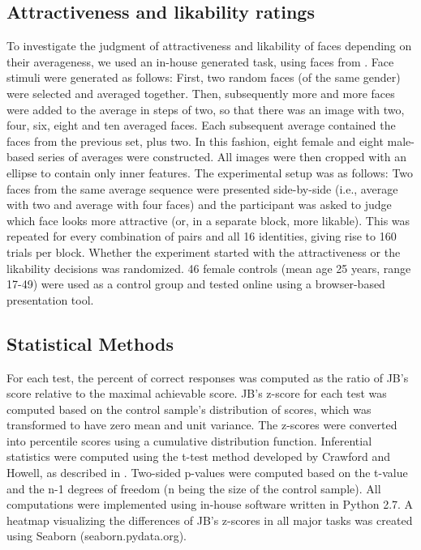 \documentclass[fleqn,10pt]{SelfArx} %
\begin{document}
\subsection*{Attractiveness and likability ratings}
To investigate the judgment of attractiveness and likability of faces depending on their averageness, we used an in-house generated task, using faces from \citet{DeBruine2017}. Face stimuli were generated as follows: First, two random faces (of the same gender) were selected and averaged together. Then, subsequently more and more faces were added to the average in steps of two, so that there was an image with two, four, six, eight and ten averaged faces. Each subsequent average contained the faces from the previous set, plus two. In this fashion, eight female and eight male-based series of averages were constructed. All images were then cropped with an ellipse to contain only inner features.
The experimental setup was as follows: Two faces from the same average sequence were presented side-by-side (i.e., average with two and average with four faces) and the participant was asked to judge which face looks more attractive (or, in a separate block, more likable). This was repeated for every combination of pairs and all 16 identities, giving rise to 160 trials per block. Whether the experiment started with the attractiveness or the likability decisions was randomized. 46 female controls (mean age 25 years, range 17-49) were used as a control group and tested online using a browser-based presentation tool.

\subsection*{Statistical Methods}
For each test, the percent of correct responses was computed as the ratio of JB’s score relative to the maximal achievable score. JB’s z-score for each test was computed based on the control sample’s distribution of scores, which was transformed to have zero mean and unit variance. The z-scores were converted into percentile scores using a cumulative distribution function. Inferential statistics were computed using the t-test method developed by Crawford and Howell, as described in \citet{Crawford_2009}. Two-sided p-values were computed based on the t-value and the n-1 degrees of freedom (n being the size of the control sample). All computations were implemented using in-house software written in Python 2.7. A heatmap visualizing the differences of JB’s z-scores in all major tasks was created using Seaborn (seaborn.pydata.org).
\end{document}
